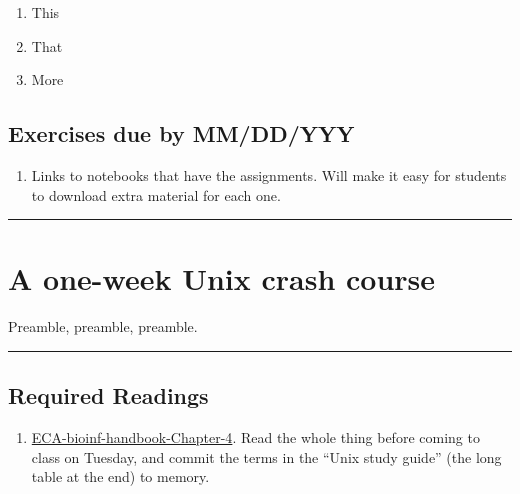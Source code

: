 \documentclass[]{book}
\providecommand{\tightlist}{%
  \setlength{\itemsep}{0pt}\setlength{\parskip}{0pt}}
\begin{document}
\begin{enumerate}
\def\labelenumi{\arabic{enumi}.}
\tightlist
\item
  This
\item
  That
\item
  More
\end{enumerate}

\hypertarget{exercises-due-by-mmddyyy}{%
\section*{Exercises due by MM/DD/YYY}\label{exercises-due-by-mmddyyy}}

\begin{enumerate}
\def\labelenumi{\arabic{enumi}.}
\tightlist
\item
  Links to notebooks that have the assignments. Will make it
  easy for students to download extra material for each one.
\end{enumerate}

\begin{center}\rule{0.5\linewidth}{\linethickness}\end{center}

\hypertarget{a-one-week-unix-crash-course}{%
\chapter{A one-week Unix crash course}\label{a-one-week-unix-crash-course}}

Preamble, preamble, preamble.

\begin{center}\rule{0.5\linewidth}{\linethickness}\end{center}

\hypertarget{required-readings-1}{%
\section*{Required Readings}\label{required-readings-1}}

\begin{enumerate}
\def\labelenumi{\arabic{enumi}.}
\tightlist
\item
  \href{https://eriqande.github.io/eca-bioinf-handbook/essential-unixlinux-terminal-knowledge.html}{ECA-bioinf-handbook-Chapter-4}. Read the whole
  thing before coming to class on Tuesday, and commit the terms in the ``Unix study guide'' (the long table at the end) to memory.
\end{enumerate}
\end{document}
